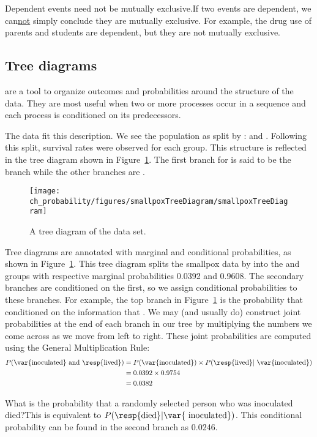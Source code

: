 \begin{caution}{Dependent events need not be mutually exclusive.}{If two events are dependent, we can\underline{not} simply conclude they are mutually exclusive. For example, the drug use of parents and students are dependent, but they are not mutually exclusive.}
\end{caution}

\subsection{Tree diagrams}


 are a tool to organize outcomes and probabilities around the structure of the data. They are most useful when two or more processes occur in a sequence and each process is conditioned on its predecessors.

The  data fit this description. We see the population as split by :  and . Following this split, survival rates were observed for each group. This structure is reflected in the tree diagram shown in Figure~\ref{smallpoxTreeDiagram}. The first branch for  is said to be the  branch while the other branches are .

\begin{figure}[ht]
\centering
\texttt{[image: ch\_probability/figures/smallpoxTreeDiagram/smallpoxTreeDiagram]}
\caption{A tree diagram of the  data set.}
\label{smallpoxTreeDiagram}
\end{figure}

Tree diagrams are annotated with marginal and conditional probabilities, as shown in Figure~\ref{smallpoxTreeDiagram}. This tree diagram splits the smallpox data by  into the  and  groups with respective marginal probabilities 0.0392 and 0.9608. The secondary branches are conditioned on the first, so we assign conditional probabilities to these branches. For example, the top branch in Figure~\ref{smallpoxTreeDiagram} is the probability that  conditioned on the information that . We may (and usually do) construct joint probabilities at the end of each branch in our tree by multiplying the numbers we come across as we move from left to right. These joint probabilities are computed using the General Multiplication Rule:
\begin{align*}
P(\text{\var{inoculated} and \resp{lived}}) &= P(\text{\var{inoculated}})\times P(\text{\resp{lived}}|\text{ \var{inoculated}}) \\
	&= 0.0392\times 0.9754 \\
	&=0.0382
\end{align*}
\begin{example}{What is the probability that a randomly selected person who was inoculated died?}This is equivalent to $P(\text{\resp{died}} | \text{\var{ inoculated}})$. This conditional probability can be found in the second branch as 0.0246.
\end{example}

